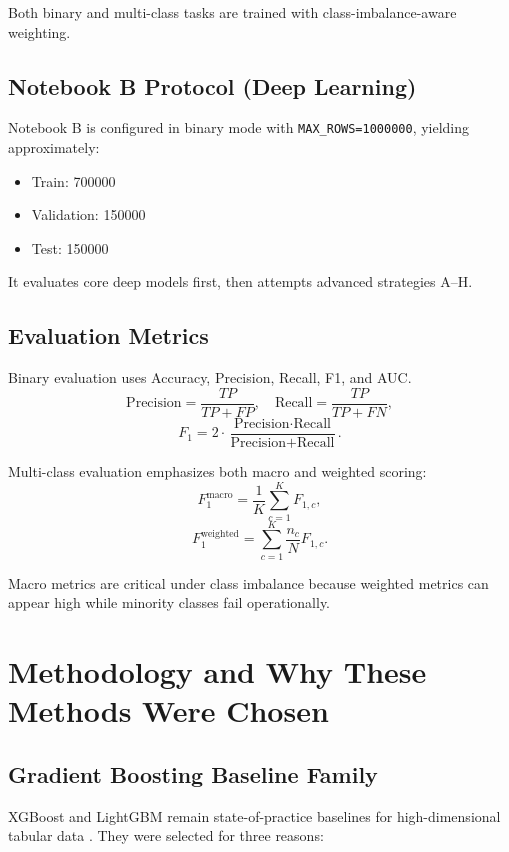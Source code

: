 \documentclass[10pt,journal]{IEEEtran}
\begin{document}
Both binary and multi-class tasks are trained with class-imbalance-aware weighting.

\subsection{Notebook B Protocol (Deep Learning)}
Notebook B is configured in binary mode with \texttt{MAX\_ROWS=1000000}, yielding approximately:

\begin{itemize}
\item Train: \num{700000}
\item Validation: \num{150000}
\item Test: \num{150000}
\end{itemize}

It evaluates core deep models first, then attempts advanced strategies A--H.

\subsection{Evaluation Metrics}
Binary evaluation uses Accuracy, Precision, Recall, F1, and AUC.
\begin{equation}
\text{Precision}=\frac{TP}{TP+FP},\quad
\text{Recall}=\frac{TP}{TP+FN},
\end{equation}
\begin{equation}
F_1 = 2\cdot\frac{\text{Precision}\cdot\text{Recall}}{\text{Precision}+\text{Recall}}.
\end{equation}

Multi-class evaluation emphasizes both macro and weighted scoring:
\begin{equation}
F_1^{\text{macro}} = \frac{1}{K}\sum_{c=1}^{K} F_{1,c},
\end{equation}
\begin{equation}
F_1^{\text{weighted}} = \sum_{c=1}^{K} \frac{n_c}{N}F_{1,c}.
\end{equation}

Macro metrics are critical under class imbalance because weighted metrics can appear high while minority classes fail operationally.

\section{Methodology and Why These Methods Were Chosen}
\subsection{Gradient Boosting Baseline Family}
XGBoost and LightGBM remain state-of-practice baselines for high-dimensional tabular data \cite{chen2016xgboost,ke2017lightgbm}. They were selected for three reasons:
\end{document}
